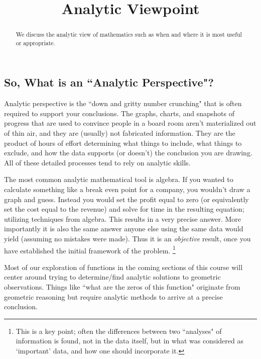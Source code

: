 \documentclass{ximera}
\title{Analytic Viewpoint}
\begin{document}
\begin{abstract}
    We discuss the analytic view of mathematics such as when and where it is most useful or appropriate.
\end{abstract}
\maketitle

\subsection*{So, What is an ``Analytic Perspective"?}
    Analytic perspective is the ``down and gritty number crunching" that is often required to support your conclusions. The graphs, charts, and snapshots of progress that are used to convince people in a board room aren't materialized out of thin air, and they are (usually) not fabricated information. They are the product of hours of effort determining what things to include, what things to exclude, and how the data supports (or doesn't) the conclusion you are drawing. All of these detailed processes tend to rely on analytic skills.
    
    The most common analytic mathematical tool is algebra. If you wanted to calculate something like a break even point for a company, you wouldn't draw a graph and guess. Instead you would set the profit equal to zero (or equivalently set the cost equal to the revenue) and solve for time in the resulting equation; utilizing techniques from algebra. This results in a very precise answer. More importantly it is also the same answer anyone else using the same data would yield (assuming no mistakes were made). Thus it is an \textit{objective} result, once you have established the initial framework of the problem.%
    \footnote{%
        This is a key point; often the differences between two ``analyses" of information is found, not in the data itself, but in what was considered as `important' data, and how one should incorporate it.%
        }
    
    Most of our exploration of functions in the coming sections of this course will center around trying to determine/find analytic solutions to geometric observations. Things like ``what are the zeros of this function" originate from geometric reasoning but require analytic methods to arrive at a precise conclusion.
    
\end{document}
